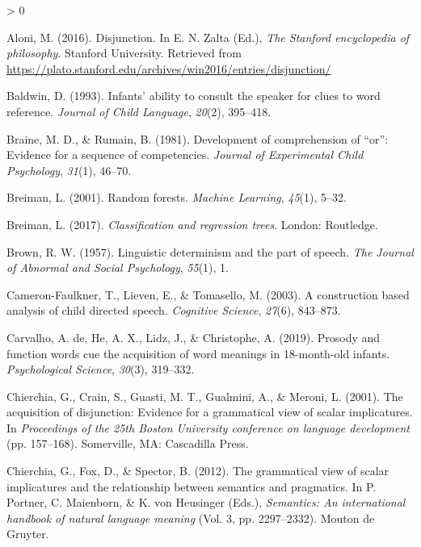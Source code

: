 \documentclass[
  english,
  ,man,floatsintext]{apa6}
\newlength{\cslhangindent}
\newenvironment{CSLReferences}[2] %
 {%
  \setlength{\parindent}{0pt}
  \ifodd #1 \everypar{\setlength{\hangindent}{\cslhangindent}}\ignorespaces\fi
  \ifnum #2 > 0
  \setlength{\parskip}{#2\baselineskip}
  \fi
 }%
 {}
\begin{document}
\setlength{\parindent}{-0.5in}
\setlength{\leftskip}{0.5in}

\hypertarget{refs}{}
\begin{CSLReferences}{1}{0}
\leavevmode\hypertarget{ref-Aloni2016}{}%
Aloni, M. (2016). Disjunction. In E. N. Zalta (Ed.), \emph{The {S}tanford encyclopedia of philosophy}. Stanford University. Retrieved from \url{https://plato.stanford.edu/archives/win2016/entries/disjunction/}

\leavevmode\hypertarget{ref-baldwin1993infants}{}%
Baldwin, D. (1993). Infants' ability to consult the speaker for clues to word reference. \emph{Journal of Child Language}, \emph{20}(2), 395--418.

\leavevmode\hypertarget{ref-braine1981development}{}%
Braine, M. D., \& Rumain, B. (1981). Development of comprehension of {``or''}: Evidence for a sequence of competencies. \emph{Journal of Experimental Child Psychology}, \emph{31}(1), 46--70.

\leavevmode\hypertarget{ref-breiman2001random}{}%
Breiman, L. (2001). Random forests. \emph{Machine Learning}, \emph{45}(1), 5--32.

\leavevmode\hypertarget{ref-breiman2017classification}{}%
Breiman, L. (2017). \emph{Classification and regression trees}. London: Routledge.

\leavevmode\hypertarget{ref-brown1957linguistic}{}%
Brown, R. W. (1957). Linguistic determinism and the part of speech. \emph{The Journal of Abnormal and Social Psychology}, \emph{55}(1), 1.

\leavevmode\hypertarget{ref-cameron2003construction}{}%
Cameron-Faulkner, T., Lieven, E., \& Tomasello, M. (2003). A construction based analysis of child directed speech. \emph{Cognitive Science}, \emph{27}(6), 843--873.

\leavevmode\hypertarget{ref-de2019prosody}{}%
Carvalho, A. de, He, A. X., Lidz, J., \& Christophe, A. (2019). Prosody and function words cue the acquisition of word meanings in 18-month-old infants. \emph{Psychological Science}, \emph{30}(3), 319--332.

\leavevmode\hypertarget{ref-chierchia2001acquisition}{}%
Chierchia, G., Crain, S., Guasti, M. T., Gualmini, A., \& Meroni, L. (2001). The acquisition of disjunction: Evidence for a grammatical view of scalar implicatures. In \emph{Proceedings of the 25th {B}oston {U}niversity conference on language development} (pp. 157--168). Somerville, MA: Cascadilla Press.

\leavevmode\hypertarget{ref-chierchia2012grammatical}{}%
Chierchia, G., Fox, D., \& Spector, B. (2012). The grammatical view of scalar implicatures and the relationship between semantics and pragmatics. In P. Portner, C. Maienborn, \& K. von Heusinger (Eds.), \emph{Semantics: An international handbook of natural language meaning} (Vol. 3, pp. 2297--2332). Mouton de Gruyter.


\end{CSLReferences}
\end{document}
